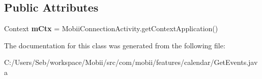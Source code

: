 \subsection*{Public Attributes}
\begin{DoxyCompactItemize}
\item 
\hypertarget{classcom_1_1mobii_1_1features_1_1calendar_1_1_get_events_a10eb17866f5d8996764075da467aa4d0}{Context {\bfseries m\-Ctx} = Mobii\-Connection\-Activity.\-get\-Context\-Application()}\label{classcom_1_1mobii_1_1features_1_1calendar_1_1_get_events_a10eb17866f5d8996764075da467aa4d0}

\end{DoxyCompactItemize}


The documentation for this class was generated from the following file\-:\begin{DoxyCompactItemize}
\item 
C\-:/\-Users/\-Seb/workspace/\-Mobii/src/com/mobii/features/calendar/Get\-Events.\-java\end{DoxyCompactItemize}
